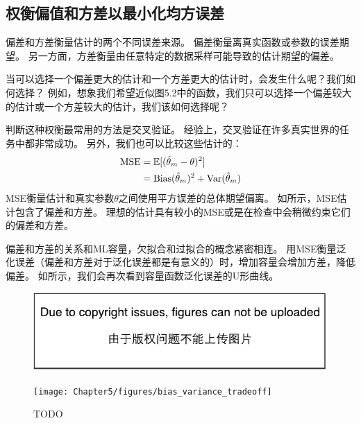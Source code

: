 
\subsection{权衡偏值和方差以最小化均方误差}
\label{sec:trading_off_bias_and_variance_to_minimize_mean_squared_error}
偏差和方差衡量估计的两个不同误差来源。
偏差衡量离真实函数或参数的误差期望。
另一方面，方差衡量由任意特定的数据采样可能导致的估计期望的偏差。

当可以选择一个偏差更大的估计和一个方差更大的估计时，会发生什么呢？我们如何选择？
例如，想象我们希望近似图5.2中的函数，我们只可以选择一个偏差较大的估计或一个方差较大的估计，我们该如何选择呢？

判断这种权衡最常用的方法是交叉验证。
经验上，交叉验证在许多真实世界的任务中都非常成功。
另外，我们也可以比较这些估计的：
\begin{align}
    \text{MSE} &= \mathbb{E}[ ( \hat{\theta}_m - \theta  )^2 ] \\
        &= \text{Bias}( \hat{\theta}_m )^2 + \text{Var}( \hat{\theta}_m ) \label{eq:5.54}
\end{align}
MSE衡量估计和真实参数$\theta$之间使用平方误差的总体期望偏离。
如所示，MSE估计包含了偏差和方差。
理想的估计具有较小的MSE或是在检查中会稍微约束它们的偏差和方差。

偏差和方差的关系和\gls{ML}容量，欠拟合和过拟合的概念紧密相连。
用MSE衡量泛化误差（偏差和方差对于泛化误差都是有意义的）时，增加容量会增加方差，降低偏差。
如所示，我们会再次看到容量函数泛化误差的U形曲线。

\begin{figure}[!htb]
\ifOpenSource
\centerline{\includegraphics{figure.pdf}}
\else
\centerline{\texttt{[image: Chapter5/figures/bias\_variance\_tradeoff]}}
\fi
\caption{TODO}
\label{fig:chap5_bias_variance_tradeoff}
\end{figure}


